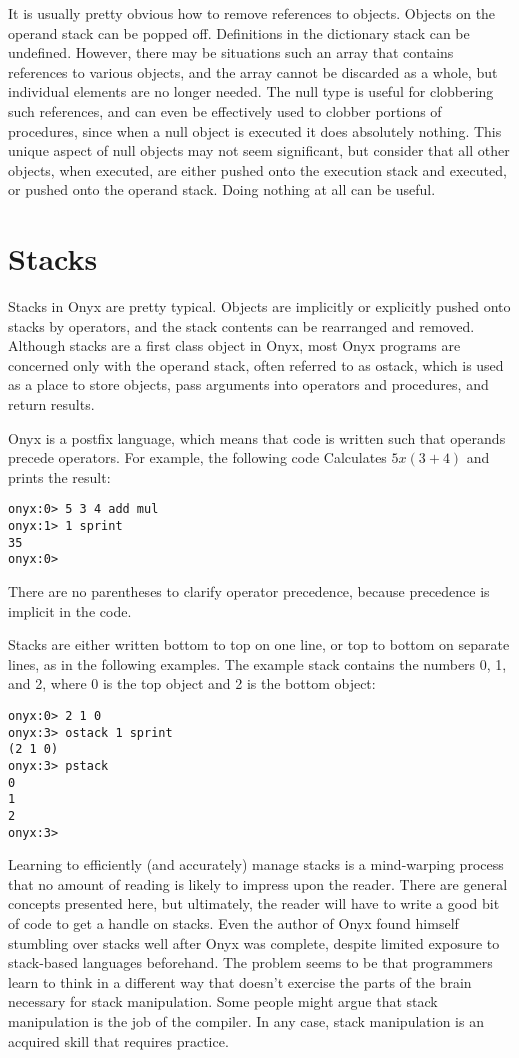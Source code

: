 It is usually pretty obvious how to remove references to objects.  Objects on
the operand stack can be popped off.  Definitions in the dictionary stack can be
undefined.  However, there may be situations such an array that contains
references to various objects, and the array cannot be discarded as a whole, but
individual elements are no longer needed.  The null type is useful for
clobbering such references, and can even be effectively used to clobber portions
of procedures, since when a null object is executed it does absolutely nothing.
This unique aspect of null objects may not seem significant, but consider that
all other objects, when executed, are either pushed onto the execution stack and
executed, or pushed onto the operand stack.  Doing nothing at all can be useful.

\section{Stacks}

Stacks in Onyx are pretty typical.  Objects are implicitly or explicitly pushed
onto stacks by operators, and the stack contents can be rearranged and removed.
Although stacks are a first class object in Onyx, most Onyx programs are
concerned only with the operand stack, often referred to as ostack, which is
used as a place to store objects, pass arguments into operators and procedures,
and return results.

Onyx is a postfix language, which means that code is written such that operands
precede operators.  For example, the following code Calculates $5 x (3 + 4)$ and
prints the result:

\begin{verbatim}
onyx:0> 5 3 4 add mul
onyx:1> 1 sprint
35
onyx:0>
\end{verbatim}

There are no parentheses to clarify operator precedence, because precedence is
implicit in the code.

Stacks are either written bottom to top on one line, or top to bottom on
separate lines, as in the following examples.  The example stack contains the
numbers 0, 1, and 2, where 0 is the top object and 2 is the bottom object:

\begin{verbatim}
onyx:0> 2 1 0
onyx:3> ostack 1 sprint
(2 1 0)
onyx:3> pstack
0
1
2
onyx:3>
\end{verbatim}

Learning to efficiently (and accurately) manage stacks is a mind-warping process
that no amount of reading is likely to impress upon the reader.  There are
general concepts presented here, but ultimately, the reader will have to write a
good bit of code to get a handle on stacks.  Even the author of Onyx found
himself stumbling over stacks well after Onyx was complete, despite limited
exposure to stack-based languages beforehand.  The problem seems to be that
programmers learn to think in a different way that doesn't exercise the parts of
the brain necessary for stack manipulation.  Some people might argue that stack
manipulation is the job of the compiler.  In any case, stack manipulation is an
acquired skill that requires practice.

